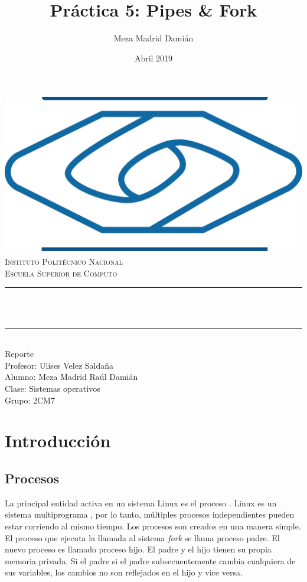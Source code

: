 \documentclass[12pt]{article}
\title{Práctica 5: Pipes \& Fork}%
\author{Meza Madrid Damián}%
\date{Abril 2019}%
\makeatletter
\let\thetitle\@title
\makeatother
\begin{document}

\begin{titlepage}
	\centering
    \vspace*{0.5 cm}
    \includegraphics[scale = 0.30]{escom.png}\\[1.0 cm]	%
	\textsc{\Large Instituto Politécnico Nacional}\\[0.5 cm]%
	\textsc{\Large Escuela Superior de Computo}\\[0.5 cm]%
	\rule{\linewidth}{0.2 mm} \\[0.4 cm]
	{ \huge \bfseries \thetitle}\\
	\rule{\linewidth}{0.2 mm} \\[1.5 cm]
	Reporte\\
	Profesor: Ulises Velez Saldaña \\
	Alumno: Meza Madrid Raúl Damián\\
    Clase: Sistemas operativos\\
    Grupo: 2CM7\\
\end{titlepage}
\tableofcontents
\pagebreak
\section{Introducción}
\subsection{Procesos}
La principal entidad activa en un sistema Linux es el proceso . Linux es un sistema multiprograma , por lo tanto, múltiples procesos independientes pueden estar corriendo al mismo tiempo. Los procesos son creados en  una manera simple. El proceso que ejecuta la llamada al sistema \emph{fork} se llama proceso padre. El nuevo proceso es llamado proceso hijo. El padre y el hijo tienen su propia memoria privada. Si el padre si el padre subsecuentemente cambia cualquiera de sus variables, los cambios no son reflejados en el hijo y vice versa. 
\end{document}
